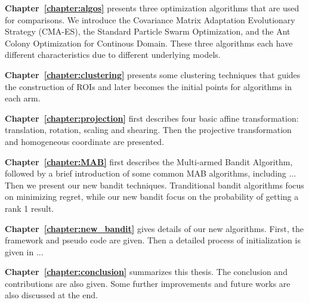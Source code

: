 \textbf{Chapter~\ref{chapter:algos}} presents three optimization algorithms that are used for comparisons.
We introduce 
the Covariance Matrix Adaptation Evolutionary Strategy (CMA-ES),
the Standard Particle Swarm Optimization, and
the Ant Colony Optimization for Continous Domain.
These three algorithms each have different characteristics due to different underlying models.


\textbf{Chapter~\ref{chapter:clustering}} presents some clustering techniques that guides the construction of ROIs and later becomes the initial points for algorithms in each arm.  

\textbf{Chapter~\ref{chapter:projection}} first describes four basic affine transformation: translation, rotation, scaling and shearing.
Then the projective transformation and homogeneous coordinate are presented.


\textbf{Chapter~\ref{chapter:MAB}} first describes the Multi-armed Bandit Algorithm, 
followed by a brief introduction of some common MAB algorithms, including ...
Then we present our new bandit techniques.
Tranditional bandit algorithms focus on minimizing regret, while our new bandit focus on the probability of getting a rank 1 result.


\textbf{Chapter~\ref{chapter:new_bandit}} gives details of our new algorithms.
First, the framework and pseudo code are given.
Then a detailed process of initialization is given in ...

\textbf{Chapter~\ref{chapter:conclusion}} summarizes this thesis. 
The conclusion and contributions are also given.
Some further improvements and future works are also discussed at the end.


